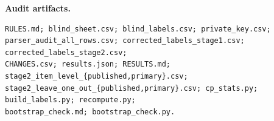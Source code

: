 \documentclass[10pt]{article}
\begin{document}
\textbf{Audit artifacts.}
\begin{Verbatim}[breaklines=true,breakanywhere=true,fontsize=\small]
RULES.md; blind_sheet.csv; blind_labels.csv; private_key.csv;
parser_audit_all_rows.csv; corrected_labels_stage1.csv; corrected_labels_stage2.csv;
CHANGES.csv; results.json; RESULTS.md; stage2_item_level_{published,primary}.csv;
stage2_leave_one_out_{published,primary}.csv; cp_stats.py; build_labels.py; recompute.py;
bootstrap_check.md; bootstrap_check.py.
\end{Verbatim}
\end{document}

